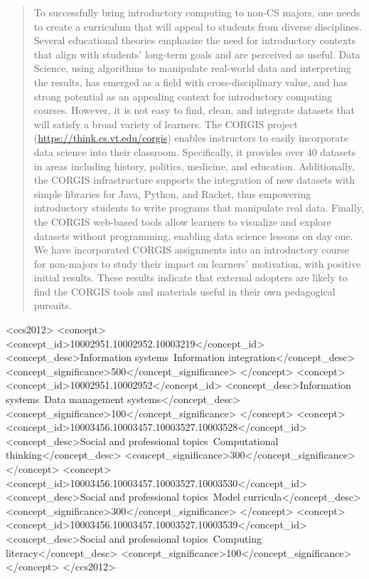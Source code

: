 \documentclass{sig-alternate}
\begin{document}
\maketitle
\begin{abstract}

To successfully bring introductory computing to non-CS majors, one needs to create a curriculum that will appeal to students from diverse disciplines.
Several educational theories emphasize the need for introductory contexts that align with students' long-term goals and are perceived as useful.
Data Science, using algorithms to manipulate real-world data and interpreting the results, has emerged as a field with cross-disciplinary value, and has strong potential as an appealing context for introductory computing courses.
However, it is not easy to find, clean, and integrate datasets that will satisfy a broad variety of learners.
The CORGIS project (\url{https://think.cs.vt.edu/corgis}) enables instructors to easily incorporate data science into their classroom.
Specifically, it provides over 40 datasets in areas including history, politics, medicine, and education.
Additionally, the CORGIS infrastructure supports the integration of new datasets with simple libraries for Java, Python, and Racket, thus empowering introductory students to write programs that manipulate real data.
Finally, the CORGIS web-based tools allow learners to visualize and explore datasets without programming, enabling data science lessons on day one.
We have incorporated CORGIS assignments into an introductory course for non-majors to study their impact on learners' motivation, with positive initial results.
These results indicate that external adopters are likely to find the CORGIS tools and materials useful in their own pedagogical pursuits.
\end{abstract}



\begin{CCSXML}
<ccs2012>
<concept>
<concept_id>10002951.10002952.10003219</concept_id>
<concept_desc>Information systems~Information integration</concept_desc>
<concept_significance>500</concept_significance>
</concept>
<concept>
<concept_id>10002951.10002952</concept_id>
<concept_desc>Information systems~Data management systems</concept_desc>
<concept_significance>100</concept_significance>
</concept>
<concept>
<concept_id>10003456.10003457.10003527.10003528</concept_id>
<concept_desc>Social and professional topics~Computational thinking</concept_desc>
<concept_significance>300</concept_significance>
</concept>
<concept>
<concept_id>10003456.10003457.10003527.10003530</concept_id>
<concept_desc>Social and professional topics~Model curricula</concept_desc>
<concept_significance>300</concept_significance>
</concept>
<concept>
<concept_id>10003456.10003457.10003527.10003539</concept_id>
<concept_desc>Social and professional topics~Computing literacy</concept_desc>
<concept_significance>100</concept_significance>
</concept>
</ccs2012>
\end{CCSXML}
\end{document}
